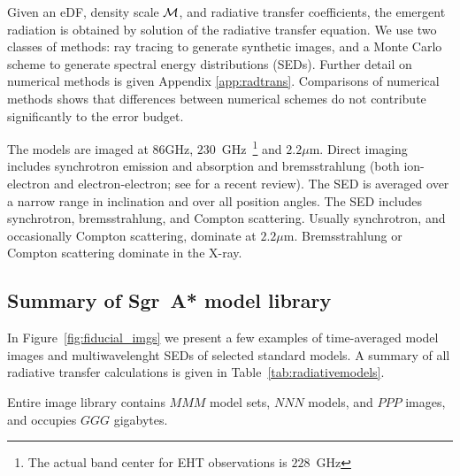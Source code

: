 
Given an eDF, density scale $\mathcal{M}$, and radiative transfer coefficients, the emergent radiation is obtained by solution of the radiative transfer equation.  We use two classes of methods: ray tracing to generate synthetic images, and a Monte Carlo scheme to generate spectral energy distributions (SEDs).  Further detail on numerical methods is given Appendix \ref{app:radtrans}.  Comparisons of numerical methods \citep[][Prather et al. 2021]{2020ApJ...897..148G} shows that differences between numerical schemes do not contribute significantly to the error budget.  

The models are imaged at $86$GHz, $230$~GHz~\footnote{The actual band center for EHT observations is $228$~GHz} and $2.2\mu$m.  Direct imaging includes synchrotron emission and absorption and bremsstrahlung (both ion-electron and electron-electron; see \citet{2020ApJ...898...50Y} for a recent review).  The SED is averaged over a narrow range in inclination and over all position angles. The SED includes synchrotron, bremsstrahlung, and Compton scattering.  Usually synchrotron, and occasionally Compton scattering, dominate at $2.2\mu$m.  Bremsstrahlung or Compton scattering dominate in the X-ray. 

\subsection{Summary of Sgr~A* model library}

In Figure~\ref{fig:fiducial_imgs} we present a few examples of time-averaged model images and multiwavelenght SEDs of selected standard \sgra models. A summary of all radiative transfer calculations is given in Table~\ref{tab:radiativemodels}.

Entire image library contains $MMM$ model sets, $NNN$ models, and $PPP$ images, and occupies $GGG$ gigabytes.

